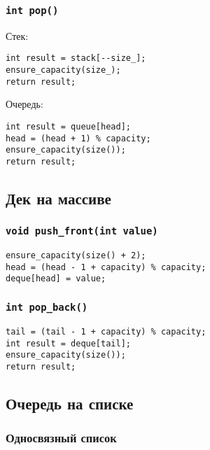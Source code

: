 \documentclass[pdf,russian,aspectratio=169]{beamer}
\begin{document}
\begin{frame}[fragile]
  \frametitle{\texttt{int pop()}}
  Стек:
  \begin{verbatim}
int result = stack[--size_];
ensure_capacity(size_);
return result;
  \end{verbatim}
  \pause
  \vspace{1em}
  Очередь:
  \begin{verbatim}
int result = queue[head];
head = (head + 1) % capacity;
ensure_capacity(size());
return result;
  \end{verbatim}
\end{frame}

\subsection{Дек на массиве}

\begin{frame}[fragile]
  \frametitle{\texttt{void push_front(int value)}}
  \begin{verbatim}
ensure_capacity(size() + 2);
head = (head - 1 + capacity) % capacity;
deque[head] = value;
  \end{verbatim}
\end{frame}

\begin{frame}[fragile]
  \frametitle{\texttt{int pop_back()}}
  \begin{verbatim}
tail = (tail - 1 + capacity) % capacity;
int result = deque[tail];
ensure_capacity(size());
return result;
  \end{verbatim}
\end{frame}

\subsection{Очередь на списке}

\begin{frame}[fragile]
  \frametitle{Односвязный список}
  \begin{center}
  \end{center}
\end{frame}
\end{document}
